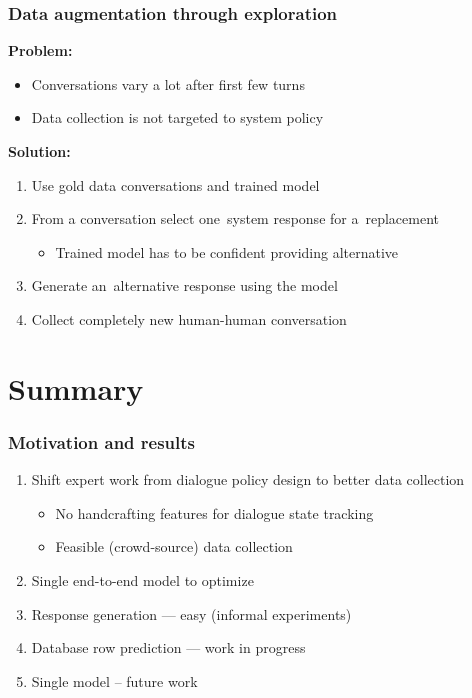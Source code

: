 \documentclass[10pt, compress,british,xcolor={svgnames,dvipsnames,x11names},trans]{beamer}
\begin{document}
\begin{frame}\frametitle{Data augmentation through exploration}
    {\bf Problem:}
    \begin{itemize}
        \item Conversations vary a lot after first few turns
        \item Data collection is not targeted to system policy
    \end{itemize}
    {\bf Solution:} \\
    \begin{enumerate}
        \item Use gold data conversations and trained model   
        \item From a conversation select one~system response for a~replacement
            \begin{itemize}
                \item Trained model has to be confident providing alternative
            \end{itemize}
        \item Generate an~alternative response using the model
        \item Collect completely new human-human conversation 
    \end{enumerate}
\end{frame}

\section{Summary}

\begin{frame}\frametitle{Motivation and results}
    \begin{enumerate}
        \item Shift expert work from dialogue policy design to better data collection 
        \begin{itemize}
            \item No handcrafting features for dialogue state tracking~\cite{platek_recurrent_2016}
            \item Feasible (crowd-source) data collection~\cite{platek2016wochat}
        \end{itemize}
        \item Single end-to-end model to optimize
            \item Response generation --- easy (informal experiments)
            \item Database row prediction --- work in progress
            \item Single model -- future work
    \end{enumerate}
\end{frame}
\end{document}
